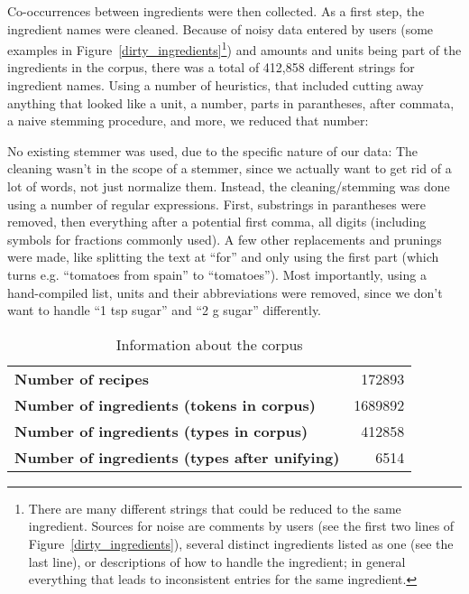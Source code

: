 Co-occurrences between ingredients were then collected. As a first step, the ingredient names were cleaned.
Because of noisy data entered by users (some examples in Figure~\ref{dirty_ingredients}\footnote{There are many different strings that could be reduced to the same ingredient. Sources for noise are comments by users (see the first two lines of Figure~\ref{dirty_ingredients}), several distinct ingredients listed as one (see the last line), or descriptions of how to handle the ingredient; in general everything that leads to inconsistent entries for the same ingredient.}) and amounts and units being part of the ingredients in the corpus, there was a total of 412,858 different strings for ingredient names. Using a number of heuristics, that included cutting away anything that looked like a unit, a number, parts in parantheses, after commata, a naive stemming procedure, and more, we reduced that number:

No existing stemmer was used, due to the specific nature of our data: The cleaning wasn't in the scope of a stemmer, since we actually want to get rid of a lot of words, not just normalize them. Instead, the cleaning/stemming was done using a number of regular expressions. First, substrings in parantheses were removed, then everything after a potential first comma, all digits (including symbols for fractions commonly used). A few other replacements and prunings were made, like splitting the text at ``for'' and only using the first part (which turns e.g. ``tomatoes from spain'' to ``tomatoes''). Most importantly, using a hand-compiled list, units and their abbreviations were removed, since we don't want to handle ``1 tsp sugar'' and ``2 g sugar'' differently.

\begin{table}
    \begin{center}
        \begin{tabular}{lr}
            \toprule
            \textbf{Number of recipes} & 172893\\
            \textbf{Number of ingredients (tokens in corpus)} & 1689892\\
            \textbf{Number of ingredients (types in corpus)} & 412858\\
            \textbf{Number of ingredients (types after unifying)} & 6514\\
            \bottomrule
        \end{tabular}
    \end{center}
    \caption{Information about the corpus}\label{tab:corpusinfo}
\end{table}

